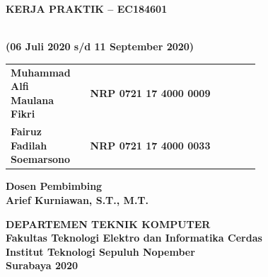 \begin{flushleft}

  \sffamily

  \noindent\textbf{KERJA PRAKTIK – EC184601}
  \vspace{4ex}

   \\
  \textbf{(06 Juli 2020 s/d 11 September 2020)}
  \vspace{6ex}

  \vspace{6ex}

  \begin{adjustwidth}{-0.2cm}{}
    \begin{tabular}{lcp{0.7\linewidth}}
      \textbf{Muhammad Alfi Maulana Fikri} & & \textbf{NRP 0721 17 4000 0009} \\
      \textbf{Fairuz Fadilah Soemarsono} & & \textbf{NRP 0721 17 4000 0033} \\
    \end{tabular}
  \end{adjustwidth}
  \vspace{4ex}

  \noindent
  \textbf{Dosen Pembimbing} \\
  \textbf{Arief Kurniawan, S.T., M.T.}
  \vspace{12ex}

  \noindent\textbf{DEPARTEMEN TEKNIK KOMPUTER} \\
  \textbf{Fakultas Teknologi Elektro dan Informatika Cerdas} \\
  \textbf{Institut Teknologi Sepuluh Nopember} \\
  \textbf{Surabaya 2020}

\end{flushleft}

\restoregeometry